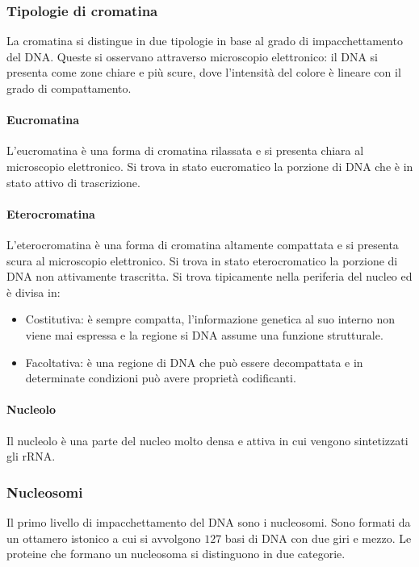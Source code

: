 		\subsubsection{Tipologie di cromatina}
		La cromatina si distingue in due tipologie in base al grado di impacchettamento del DNA.
		Queste si osservano attraverso microscopio elettronico: il DNA si presenta come zone chiare e pi\`u scure, dove l'intensit\`a del colore \`e lineare con il grado di compattamento.

			\paragraph{Eucromatina}
			L'eucromatina \`e una forma di cromatina rilassata e si presenta chiara al microscopio elettronico.
			Si trova in stato eucromatico la porzione di DNA che \`e in stato attivo di trascrizione.

			\paragraph{Eterocromatina}
			L'eterocromatina \`e una forma di cromatina altamente compattata e si presenta scura al microscopio elettronico.
			Si trova in stato eterocromatico la porzione di DNA non attivamente trascritta.
			Si trova tipicamente nella periferia del nucleo ed \`e divisa in:
			\begin{multicols}{2}
				\begin{itemize}
					\item Costitutiva: \`e sempre compatta, l'informazione genetica al suo interno non viene mai espressa e la regione si DNA assume una funzione strutturale.
					\item Facoltativa: \`e una regione di DNA che pu\`o essere decompattata e in determinate condizioni pu\`o avere propriet\`a codificanti.
				\end{itemize}
			\end{multicols}

			\paragraph{Nucleolo}
			Il nucleolo \`e una parte del nucleo molto densa e attiva in cui vengono sintetizzati gli rRNA.
	
		\subsubsection{Nucleosomi}
		Il primo livello di impacchettamento del DNA sono i nucleosomi.
		Sono formati da un ottamero istonico a cui si avvolgono $127$ basi di DNA con due giri e mezzo.
		Le proteine che formano un nucleosoma si distinguono in due categorie.
		
